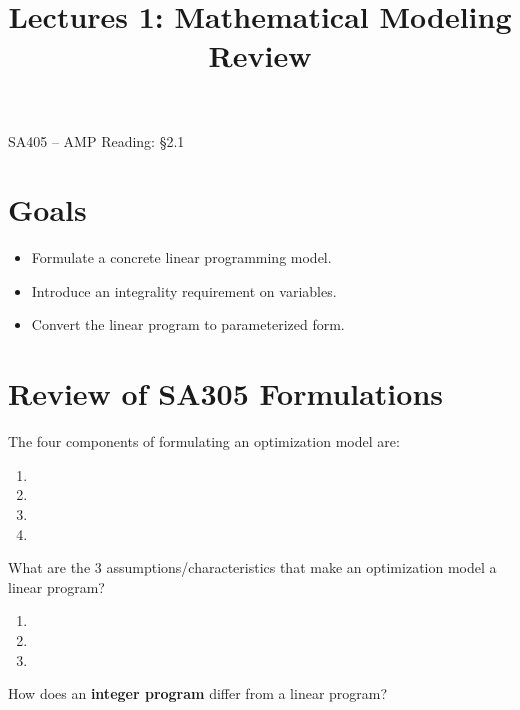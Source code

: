 \documentclass[12pt]{article}
\makeatletter
\theoremstyle{definition}
\newcommand{\graphbox}[5]%
{
\begin{tikzpicture}
     [>=latex,scale=#5]
     
     \draw [->,very thick] (#1, 0) -- (#2, 0) node[right] {$x$};
     \draw [->,very thick] (0, #3) -- (0, #4) node[above] {$y$};
     
     \draw[step=1cm,thick,dotted] (#1,#3) grid (#2,#4);
   \end{tikzpicture}
   }
\renewcommand{\maketitle}{
  \noindent SA405 -- AMP \hfill  Reading: \S 2.1 \\

  \begin{center}\Large{\textbf{\@title}}\end{center}
}
\makeatother
\begin{document}

\title{Lectures 1: Mathematical Modeling Review}


\maketitle

\section{Goals}
\begin{itemize}
\item  Formulate a concrete linear programming model.
\item  Introduce an integrality requirement on variables.
\item  Convert the linear program to parameterized form.
\end{itemize}

\section{Review of SA305 Formulations}

The four components of formulating an optimization model are:

\begin{enumerate}
\item \phantom{a} 
\item \phantom{a} \vspace{0.75in}
\item \phantom{a} \vspace{0.75in}
\item \phantom{a} \vspace{0.75in}
\end{enumerate}

\newpage

What are the 3 assumptions/characteristics that make an optimization model a linear program?
\begin{enumerate}
\item \phantom{a}
\item \phantom{a}
\item \phantom{a}
\end{enumerate}

\vspace{1in}

How does an \textbf{integer program} differ from a linear program?
\end{document}
